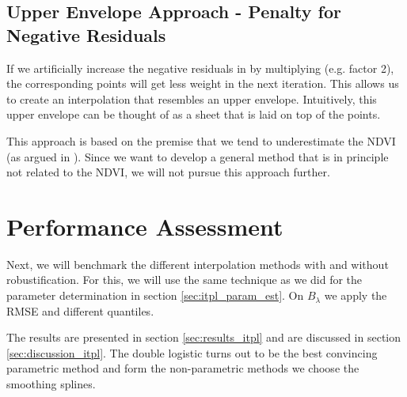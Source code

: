 {	\subsection{Upper Envelope Approach - Penalty for Negative Residuals}
		If we artificially increase the negative residuals in  by multiplying (e.g. factor 2), the corresponding points will get less weight in the next iteration. This allows us to create an interpolation that resembles an upper envelope. Intuitively, this upper envelope can be thought of as a sheet that is laid on top of the points.
			
		This approach is based on the premise that we tend to underestimate the NDVI (as argued in \cite{caoSimpleMethodImprove2018b}). Since we want to develop a general method that is in principle not related to the NDVI, we will not pursue this approach further.	
}
\section{Performance Assessment}{
	Next, we will benchmark the different interpolation methods with and without robustification. For this, we will use the same technique as we did for the parameter determination in section \ref{sec:itpl_param_est}. On $B_\lambda$ we apply the RMSE and different quantiles.  

	The results are presented in section \ref{sec:results_itpl} and are discussed in section \ref{sec:discussion_itpl}. The double logistic turns out to be the best convincing parametric method and form the non-parametric methods we choose the smoothing splines.
}


